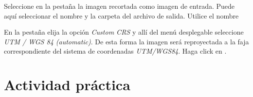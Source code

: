 Seleccione en la pestaña  la imagen recortada como imagen de entrada. Puede aquí seleccionar el nombre y la carpeta del archivo de salida. Utilice el nombre

\begin{center}
\end{center}

En la pestaña  elija la opción \emph{Custom CRS} y allí del menú desplegable seleccione \emph{UTM / WGS 84 (automatic)}. De esta forma la imagen será reproyectada a la faja correspondiente del sistema de coordenadas \emph{UTM/WGS84}. Haga click en .

\section{Actividad práctica}

